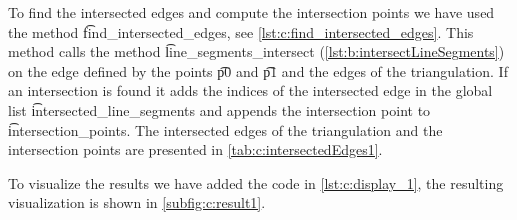 To find the intersected edges and compute the intersection points we have used the method \t{find_intersected_edges}, see \autoref{lst:c:find_intersected_edges}. This method calls the method \t{line_segments_intersect} (\autoref{lst:b:intersectLineSegments}) on the edge defined by the points \t{p0} and \t{p1} and the edges of the triangulation. If an intersection is found it adds the indices of the intersected edge in the global list \t{intersected_line_segments} and appends the intersection point to \t{intersection_points}. The intersected edges of the triangulation and the intersection points are presented in \autoref{tab:c:intersectedEdges1}.



To visualize the results we have added the code in \autoref{lst:c:display_1}, the resulting visualization is shown in \autoref{subfig:c:result1}.



